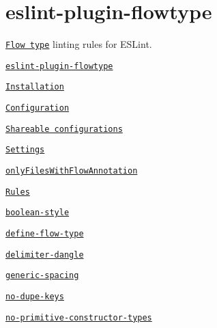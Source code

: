 \label{_eslint-plugin-flowtype}%
 \section*{eslint-\/plugin-\/flowtype}

\href{https://www.npmjs.org/package/eslint-plugin-flowtype}{\tt } \href{https://travis-ci.org/gajus/eslint-plugin-flowtype}{\tt } \href{https://github.com/gajus/canonical}{\tt }

\href{http://flowtype.org/}{\tt Flow type} linting rules for E\+S\+Lint.


\begin{DoxyItemize}
\item \href{#eslint-plugin-flowtype}{\tt eslint-\/plugin-\/flowtype}
\begin{DoxyItemize}
\item \href{#eslint-plugin-flowtype-installation}{\tt Installation}
\item \href{#eslint-plugin-flowtype-configuration}{\tt Configuration}
\begin{DoxyItemize}
\item \href{#eslint-plugin-flowtype-configuration-shareable-configurations}{\tt Shareable configurations}
\end{DoxyItemize}
\item \href{#eslint-plugin-flowtype-settings}{\tt Settings}
\begin{DoxyItemize}
\item \href{#eslint-plugin-flowtype-settings-onlyfileswithflowannotation}{\tt {\ttfamily only\+Files\+With\+Flow\+Annotation}}
\end{DoxyItemize}
\item \href{#eslint-plugin-flowtype-rules}{\tt Rules}
\begin{DoxyItemize}
\item \href{#eslint-plugin-flowtype-rules-boolean-style}{\tt {\ttfamily boolean-\/style}}
\item \href{#eslint-plugin-flowtype-rules-define-flow-type}{\tt {\ttfamily define-\/flow-\/type}}
\item \href{#eslint-plugin-flowtype-rules-delimiter-dangle}{\tt {\ttfamily delimiter-\/dangle}}
\item \href{#eslint-plugin-flowtype-rules-generic-spacing}{\tt {\ttfamily generic-\/spacing}}
\item \href{#eslint-plugin-flowtype-rules-no-dupe-keys}{\tt {\ttfamily no-\/dupe-\/keys}}
\item \href{#eslint-plugin-flowtype-rules-no-primitive-constructor-types}{\tt {\ttfamily no-\/primitive-\/constructor-\/types}}

\end{DoxyItemize}
\end{DoxyItemize}
\end{DoxyItemize}
